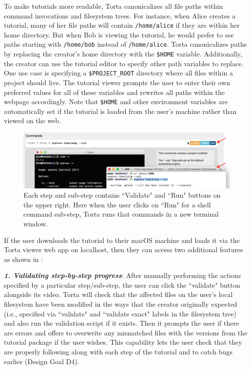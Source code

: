 To make tutorials more readable, Torta canonicalizes all file paths
within command invocations and filesystem trees. For instance, when
Alice creates a tutorial, many of her file paths will contain {\small
\texttt{/home/alice}} if they are within her home directory. But when
Bob is viewing the tutorial, he would prefer to see paths starting with
{\small \texttt{/home/bob}} instead of {\small \texttt{/home/alice}}.
Torta canonicalizes paths by replacing the creator's home directory with
the \texttt{\$HOME} variable. Additionally, the creator can use the
tutorial editor to specify other path variables to replace. One use case
is specifying a \texttt{\$PROJECT\_ROOT} directory where all files
within a project should live. The tutorial viewer prompts the user to
enter their own preferred values for all of these variables and rewrites
all paths within the webpage accordingly. Note that \texttt{\$HOME} and
other environment variables are automatically set if the tutorial is
loaded from the user's machine rather than viewed on the web.


\begin{figure}[h!]

\includegraphics[width=\columnwidth]{figures/torta/view-and-run.png}

\caption{Each step and sub-step contains ``Validate" and ``Run" buttons
on the upper right. Here when the user clicks on ``Run" for a shell
command sub-step, Torta runs that commands in a new terminal window.}

\label{fig:torta-player}
\vspace{-1em} %
\end{figure}


If the user downloads the tutorial to their macOS machine and loads it
via the Torta viewer web app on localhost, then they can access two additional features as shown
in :

\emph{\textbf{1. Validating step-by-step progress}}: After manually
performing the actions specified by a particular step/sub-step, the user
can click the ``validate" button alongside its video. Torta will check
that the affected files on the user's local filesystem have been
modified in the ways that the creator originally expected (i.e.,
specified via ``validate" and ``validate exact" labels in the filesystem
tree) and also run the validation script if it exists. Then it prompts the user if
there are errors and offers to overwrite any mismatched files with
the versions from the tutorial package if the user wishes. This
capability lets the user check that they are properly following along
with each step of the tutorial and to catch bugs earlier (Design Goal
D4).

